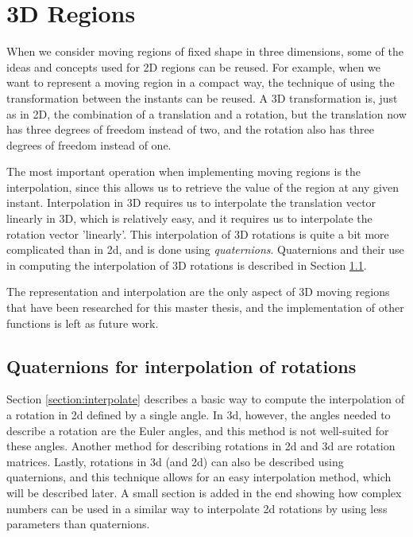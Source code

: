 
\section{3D Regions}
\label{section:3d_regions}

When we consider moving regions of fixed shape in three dimensions, some of the ideas and concepts used for 2D regions can be reused. For example, when we want to represent a moving region in a compact way, the technique of using the transformation between the instants can be reused. A 3D transformation is, just as in 2D, the combination of a translation and a rotation, but the translation now has three degrees of freedom instead of two, and the rotation also has three degrees of freedom instead of one.

The most important operation when implementing moving regions is the interpolation, since this allows us to retrieve the value of the region at any given instant. Interpolation in 3D requires us to interpolate the translation vector linearly in 3D, which is relatively easy, and it requires us to interpolate the rotation vector 'linearly'.  This interpolation of 3D rotations is quite a bit more complicated than in 2d, and is done using \textit{quaternions}. Quaternions and their use in computing the interpolation of 3D rotations is described in Section \ref{section:quaternion_interpolation}.

The representation and interpolation are the only aspect of 3D moving regions that have been researched for this master thesis, and the implementation of other functions is left as future work.

\subsection{Quaternions for interpolation of rotations}
\label{section:quaternion_interpolation}

Section \ref{section:interpolate} describes a basic way to compute the interpolation of a rotation in 2d defined by a single angle. In 3d, however, the angles needed to describe a rotation are the Euler angles, and this method is not well-suited for these angles. Another method for describing rotations in 2d and 3d are rotation matrices. Lastly, rotations in 3d (and 2d) can also be described using quaternions, and this technique allows for an easy interpolation method, which will be described later. A small section is added in the end showing how complex numbers can be used in a similar way to interpolate 2d rotations by using less parameters than quaternions.

